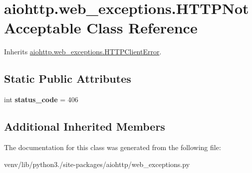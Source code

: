 \hypertarget{classaiohttp_1_1web__exceptions_1_1_h_t_t_p_not_acceptable}{}\section{aiohttp.\+web\+\_\+exceptions.\+H\+T\+T\+P\+Not\+Acceptable Class Reference}
\label{classaiohttp_1_1web__exceptions_1_1_h_t_t_p_not_acceptable}


Inherits \hyperlink{classaiohttp_1_1web__exceptions_1_1_h_t_t_p_client_error}{aiohttp.\+web\+\_\+exceptions.\+H\+T\+T\+P\+Client\+Error}.

\subsection*{Static Public Attributes}
\begin{DoxyCompactItemize}
\item 
\mbox{\label{classaiohttp_1_1web__exceptions_1_1_h_t_t_p_not_acceptable_a6589130952fce1c86fb976f4023de2ce}} 
int {\bfseries status\+\_\+code} = 406
\end{DoxyCompactItemize}
\subsection*{Additional Inherited Members}


The documentation for this class was generated from the following file\+:\begin{DoxyCompactItemize}
\item 
venv/lib/python3./site-\/packages/aiohttp/web\+\_\+exceptions.\+py\end{DoxyCompactItemize}
